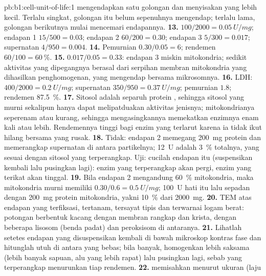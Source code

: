 \begin{solution}{pb:b1:cell-unit-of-life:1}
mengendapkan satu golongan dan menyisakan yang lebih kecil. Terlalu
singkat, golongan itu belum sepenuhnya mengendap; terlalu lama,
golongan berikutnya mulai mencemari endapannya.
\textbf{13.}  $100/2000 = \qty{0.05}{U/mg}$; endapan 1
$15/500 = 0.03$; endapan 2 $60/200 = 0.30$; endapan 3 $5/300 = 0.017$;
supernatan $4/950 = 0.004$.
\textbf{14.} Pemurnian $0.30/0.05 = 6$; rendemen $60/100 =
\qty{60}{\%}$.
\textbf{15.} $0.017/0.05 = 0.33$: endapan 3 miskin mitokondria; sedikit aktivitas yang dipegangnya berasal dari serpihan membran mitokondria yang dihasilkan penghomogenan, yang mengendap bersama mikrosomnya.
\textbf{16.} LDH:  $400/2000 = \qty{0.2}{U/mg}$; supernatan
$350/950 = \qty{0.37}{U/mg}$; pemurnian $1.8$; rendemen \qty{87.5}{\%}.
\textbf{17.} Sitosol adalah separuh protein , sehingga sitosol
yang murni sekalipun hanya dapat melipatduakan aktivitas jenisnya;
mitokondrianya seperenam atau kurang, sehingga mengasingkannya
memekatkan enzimnya enam kali atau lebih. Rendemennya tinggi bagi enzim
yang terlarut karena ia tidak ikut hilang bersama  yang rusak.
\textbf{18.} Tidak: endapan 2 memegang \qty{200}{mg} protein dan
memerangkap supernatan di antara partikelnya; \qty{12}{U} adalah
\qty{3}{\%} totalnya, yang sesuai dengan sitosol yang terperangkap. Uji:
cucilah endapan itu (suspensikan kembali lalu pusingkan lagi): enzim
yang terperangkap akan pergi, enzim yang terikat akan tinggal.
\textbf{19.} Bila endapan 2 mengandung \qty{60}{\%} mitokondria, maka
mitokondria murni memiliki $0.30/0.6 = \qty{0.5}{U/mg}$; \qty{100}{U}
hati itu lalu sepadan dengan \qty{200}{mg} protein mitokondria, yakni
\qty{10}{\%} dari \qty{2000}{mg}.
\textbf{20.} TEM atas endapan yang terfiksasi, tertanam, tersayat tipis
dan terwarnai logam berat: potongan berbentuk kacang dengan membran
rangkap dan krista, dengan beberapa lisosom (benda padat) dan peroksisom
di antaranya.
\textbf{21.} Lihatlah setetes endapan yang disuspensikan kembali di bawah mikroskop kontras fase dan hitunglah  utuh di antara  yang bebas; bila banyak, homogenkan lebih saksama (lebih banyak sapuan, alu yang lebih rapat) lalu pusingkan lagi, sebab  yang terperangkap menurunkan tiap rendemen.
\textbf{22.}  memisahkan menurut ukuran (laju

\end{solution}
